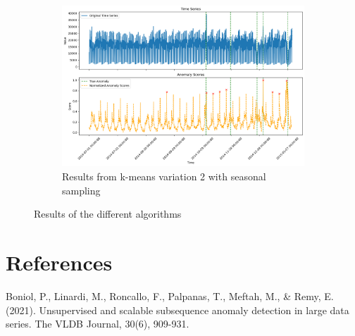 \documentclass[11pt]{article}
\begin{document}
\begin{figure}[h]
    \begin{subfigure}[b]{0.35\textwidth}
        \includegraphics[width=\textwidth]{algo4.png}
        \caption{Results from k-means variation 2 with seasonal sampling}
        \label{fig:algo3}
    \end{subfigure}
    \caption{Results of the different algorithms}
    \label{fig:results}
\end{figure}



\section{References}
\label{ref1} Boniol, P., Linardi, M., Roncallo, F., Palpanas, T., Meftah, M., \& Remy, E. (2021). Unsupervised and scalable subsequence anomaly detection in large data series. The VLDB Journal, 30(6), 909-931.
\end{document}
